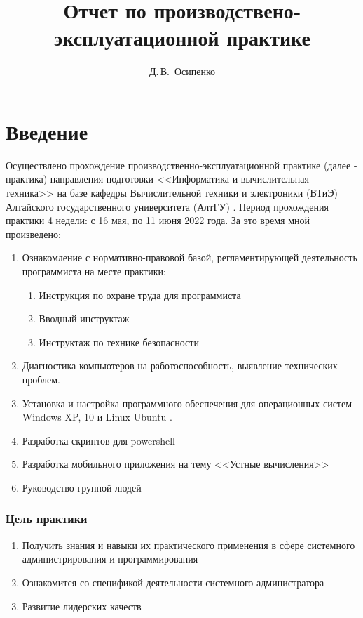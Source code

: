 \documentclass[14pt, oneside]{altsu-report}
\title{Отчет по производствено-эксплуатационной практике}
\author{Д.\,В.~Осипенко}
\institute{Институт цифровых технологий, электроники и физики}
\date{\the\year}
\begin{document}
\maketitle

\setcounter{page}{2}
\tableofcontents

\chapter*{Введение}
Осуществлено прохождение производственно-эксплуатационной практике (далее - практика) направления подготовки <<Информатика и вычислительная техника>> на базе кафедры Вычислительной техники и электроники (ВТиЭ) Алтайского государственного университета (АлтГУ) \cite{asu}.  
Период прохождения практики 4 недели: с 16 мая, по 11 июня 2022 года. За это время мной произведено:
\begin{enumerate}
  \item Ознакомление с нормативно-правовой базой, регламентирующей деятельность программиста на месте практики:
  \begin{enumerate}
    \item Инструкция по охране труда для программиста \cite{asuProgrammer}
    \item Вводный инструктаж
    \item Инструктаж по технике безопасности
  \end{enumerate}
  \item Диагностика компьютеров на работоспособность, выявление технических проблем.
  \item Установка и настройка программного обеспечения для операционных систем Windows XP, 10 \cite{wikiWindows} и Linux Ubuntu \cite{ubuntu}.
  \item Разработка скриптов для powershell \cite{powershell}
  \item Разработка мобильного приложения на тему <<Устные вычисления>> \cite{mentalMath}
  \item Руководство группой людей
\end{enumerate} 

\subsection*{Цель практики}
\begin{enumerate}
  \item Получить знания и навыки их практического применения в сфере системного администрирования и программирования
  \item Ознакомится со спецификой деятельности системного администратора
  \item Развитие лидерских качеств
\end{enumerate}
\end{document}
